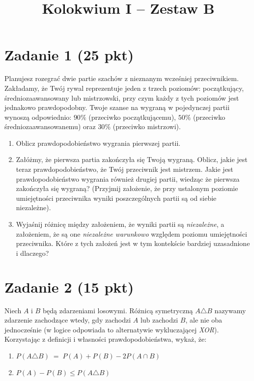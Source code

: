 \documentclass[polish, 10pt]{extarticle}
\begin{document}
\title{Kolokwium I -- Zestaw B}
\author{}
\date{}

\maketitle
\vspace{-2cm}

\section*{Zadanie 1 (25 pkt)}
Planujesz rozegrać dwie partie szachów z nieznanym wcześniej przeciwnikiem. Zakładamy, że Twój rywal reprezentuje jeden z trzech poziomów: początkujący, średniozaawansowany lub mistrzowski, przy czym każdy z tych poziomów jest jednakowo prawdopodobny.
Twoje szanse na wygraną w pojedynczej partii wynoszą odpowiednio: \(90\%\) (przeciwko początkującemu), \(50\%\) (przeciwko średniozaawansowanemu) oraz \(30\%\) (przeciwko mistrzowi).

\begin{enumerate}
  \item Oblicz prawdopodobieństwo wygrania pierwszej partii.
  \item Załóżmy, że pierwsza partia zakończyła się Twoją wygraną. Oblicz, jakie jest teraz prawdopodobieństwo, że Twój przeciwnik jest mistrzem. Jakie jest prawdopodobieństwo wygrania również drugiej partii, wiedząc że pierwsza zakończyła się wygraną? (Przyjmij założenie, że przy ustalonym poziomie umiejętności przeciwnika wyniki poszczególnych partii są od siebie niezależne). 
  \item Wyjaśnij różnicę między założeniem, że wyniki partii są \textit{niezależne}, a założeniem, że są one \textit{niezależne warunkowo} względem poziomu umiejętności przeciwnika. Które z tych założeń jest w tym kontekście bardziej uzasadnione i dlaczego?
\end{enumerate}

\section*{Zadanie 2 (15 pkt)}
Niech \(A\) i \(B\) będą zdarzeniami losowymi.
Różnicą symetryczną \(A \triangle B\) nazywamy zdarzenie zachodzące wtedy, gdy zachodzi \(A\) lub zachodzi \(B\), ale nie oba jednocześnie (w logice odpowiada to alternatywie wykluczającej \emph{XOR}). Korzystając z definicji i własności prawdopodobieństwa, wykaż, że:
\begin{enumerate}
\item $P(A \triangle B) \;=\; P(A) + P(B) - 2P(A \cap B)$
\item $P(A) - P(B) \leq P(A \triangle B)$
\end{enumerate}
\end{document}
